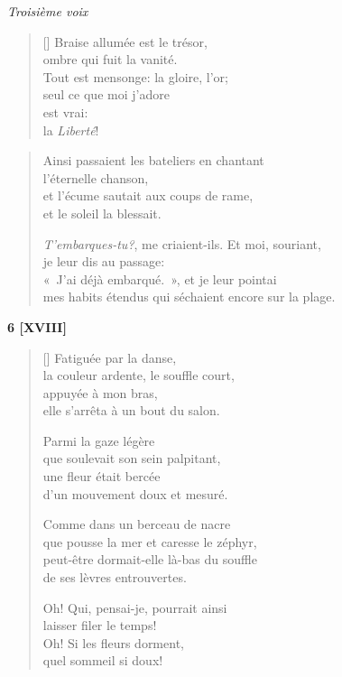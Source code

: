 \documentclass[a4paper,12pt]{book}
\begin{document}
\begin{center} \emph{Troisième voix} \end{center}

\begin{verse}[\versewidth]
  Braise allumée est le trésor, \\
  ombre qui fuit la vanité. \\
  Tout est mensonge: la gloire, l'or; \\
  seul ce que moi j'adore \\
  est vrai: \\
  la \emph{Liberté}!
\end{verse}

\begin{verse}
  Ainsi passaient les bateliers en chantant \\
  l'éternelle chanson, \\
  et l'écume sautait aux coups de rame, \\
  et le soleil la blessait.

  \emph{T'embarques-tu?}, me criaient-ils. Et moi, souriant, \\
  je leur dis au passage: \\
  «~J'ai déjà embarqué.~», et je leur pointai \\
  mes habits étendus qui séchaient encore sur la plage.
\end{verse}

\bigskip

\begin{center}
  \textbf{6 [XVIII]}
\end{center}

\settowidth{\versewidth}{que pousse la mer et caresse le zéphir,}

\begin{verse}[\versewidth]
  Fatiguée par la danse, \\
  la couleur ardente, le souffle court, \\
  appuyée à mon bras, \\
  elle s'arrêta à un bout du salon.

  Parmi la gaze légère \\
  que soulevait son sein palpitant, \\
  une fleur était bercée \\
  d'un mouvement doux et mesuré.

  Comme dans un berceau de nacre \\
  que pousse la mer et caresse le zéphyr, \\
  peut-être dormait-elle là-bas du souffle \\
  de ses lèvres entrouvertes.

  Oh! Qui, pensai-je, pourrait ainsi \\
  laisser filer le temps! \\
  Oh! Si les fleurs dorment, \\
  quel sommeil si doux!
\end{verse}
\end{document}
